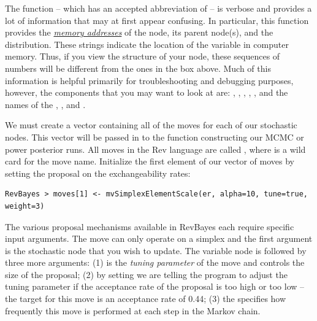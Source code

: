 The  function -- which has an accepted abbreviation of  -- is verbose and provides a lot of information that may at first appear confusing. 
In particular, this function provides the \href{http://en.wikipedia.org/wiki/Memory_address}{\textit{memory addresses}} of the node, its parent node(s), and the distribution. 
These strings indicate the location of the variable in computer memory. 
Thus, if you view the structure of your  node, these sequences of numbers will be different from the ones in the box above. 
Much of this information is helpful primarily for troubleshooting and debugging purposes, however, the components that you may want to look at are: , , , , , and the names of the , , and .

We must create a vector containing all of the moves for each of our stochastic nodes. 
This vector will be passed in to the function constructing our MCMC or power posterior runs.
All moves in the Rev language are called , where \cl{*} is a wild card for the move name. 
Initialize the first element of our vector of moves by setting the proposal on the exchangeability rates:

{\tt\small \begin{snugshade*}
\begin{lstlisting}
RevBayes > moves[1] <- mvSimplexElementScale(er, alpha=10, tune=true, weight=3) 
\end{lstlisting}
\end{snugshade*}}


The various proposal mechanisms available in RevBayes each require specific input arguments. 
The  move can only operate on a simplex and the first argument is the stochastic node that you wish to update. 
The variable node is followed by three more arguments: (1)  is the \textit{tuning parameter} of the move and controls the size of the proposal; (2) by setting  we are telling the program to adjust the tuning parameter if the acceptance rate of the proposal is too high or too low -- the target for this move is an acceptance rate of 0.44; (3) the  specifies how frequently this move is performed at each step in the Markov chain. 

